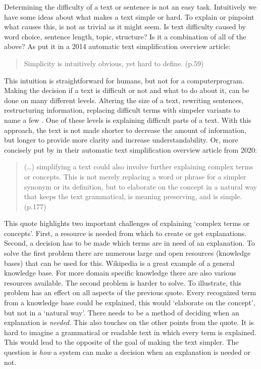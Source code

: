 \documentclass[
10pt, %
a4paper, %
oneside, %
headinclude,footinclude, %
] {book}%
\begin{document}
Determining the difficulty of a text or sentence is not an easy task.
Intuitively we have some ideas about what makes a text simple or hard.
To explain or pinpoint what causes this, is not as trivial as it might seem.
Is text difficulty caused by word choice, sentence length, topic, structure?
Is it a combination of all of the above? As \citeauthor{shardlow2014} put it in a 2014
automatic text simplification overview article:

\begin{quote}
  Simplicity is intuitively obvious, yet hard to define. (p.59)
\end{quote}

This intuition is straightforward for humans, but not for a computerprogram.
Making the decision if a text is difficult or not and what to do about it, can be done on many different levels.
Altering the size of a text, rewriting sentences, restructuring information, replacing difficult terms with simpeler variants to name a few \citep{alva2020}.
One of these levels is explaining difficult parts of a text.
With this approach, the text is not made shorter to decrease the amount of information, but longer to provide more clarity and increase understandability.
Or, more concisely put by \citeauthor{alva2020} in their automatic text simplification overview article from 2020:

\begin{quote}
  (\ldots) simplifying a text could also involve further explaining complex terms or concepts.
  This is not merely replacing a word or phrase for a simpler synonym or its definition, but to
  elaborate on the concept in a natural way that keeps the text grammatical,
  is meaning preserving, and is simple. (p.177)
\end{quote}

This quote highlights two important challenges of explaining `complex terms or concepts'.
First, a resource is needed from which to create or get explanations.
Second, a decision has to be made which terms are in need of an explanation.
To solve the first problem there are numerous large and open resources (knowledge bases) that can be used for this.
Wikipedia is a great example of a general knowledge base.
For more domain specific knowledge there are also various resources available.
The second problem is harder to solve.
To illustrate, this problem has an effect on all aspects of the previous quote.
Every recognized term from a knowledge base could be explained, this would `elaborate on the concept', but not in a `natural way'.
There needs to be a method of deciding when an explanation is \textit{needed}.
This also touches on the other points from the quote.
It is hard to imagine a grammatical or readable text in which every term is explained.
This would lead to the opposite of the goal of making the text simpler.
The question is \textit{how} a system can make a decision when an explanation is needed or not.
\end{document}
